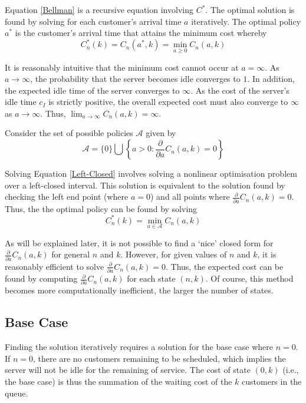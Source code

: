 Equation \ref{Bellman} is a recursive equation involving $C^{*}$. The optimal solution is found by solving for each customer's arrival time $a$ iteratively. The optimal policy $a^{*}$ is the customer's arrival time that attains the minimum cost whereby
\begin{equation} \label{Left-Closed}
	C_{n}^{*} (k) = C_{n} (a^{*}, k) = \min_{a \geq 0} C_{n} (a, k)
\end{equation}

It is reasonably intuitive that the minimum cost cannot occur at $a = \infty$. As $a \to \infty$, the probability that the server becomes idle converges to $1$. In addition, the expected idle time of the server converges to $\infty$. As the cost of the server's idle time $c_{I}$ is strictly positive, the overall expected cost must also converge to $\infty$ as $a \to \infty$. Thus, $\displaystyle \lim_{a \to \infty} C_{n} (a, k) = \infty$.

Consider the set of possible policies $\mathcal{A}$ given by
\begin{equation}
	\mathcal{A} = \{ 0 \} \bigcup \left\{ a > 0 : \frac{\partial}{\partial a} C_{n} (a, k) = 0 \right\}
\end{equation}

Solving Equation \ref{Left-Closed} involves solving a nonlinear optimisation problem over a left-closed interval. This solution is equivalent to the solution found by checking the left end point (where $a = 0$) and all points where $\frac{\partial}{\partial a} C_{n} (a, k) = 0$. Thus, the the optimal policy can be found by solving
\begin{equation}
	C_{n}^{*} (k) = \min_{a \in \mathcal{A}} C_{n} (a, k)
\end{equation}

As will be explained later, it is not possible to find a `nice' closed form for $\frac{\partial}{\partial a} C_{n} (a, k)$ for general $n$ and $k$. However, for given values of $n$ and $k$, it is reasonably efficient to solve $\frac{\partial}{\partial a} C_{n} (a, k) = 0$. Thus, the expected cost can be found by computing $\frac{\partial}{\partial a} C_{n} (a, k)$ for each state $(n, k)$. Of course, this method becomes more computationally inefficient, the larger the number of states.

\subsection{Base Case}

Finding the solution iteratively requires a solution for the base case where $n = 0$. If $n = 0$, there are no customers remaining to be scheduled, which implies the server will not be idle for the remaining of service. The cost of state $(0, k)$ (i.e., the base case) is thus the summation of the waiting cost of the $k$ customers in the queue.

